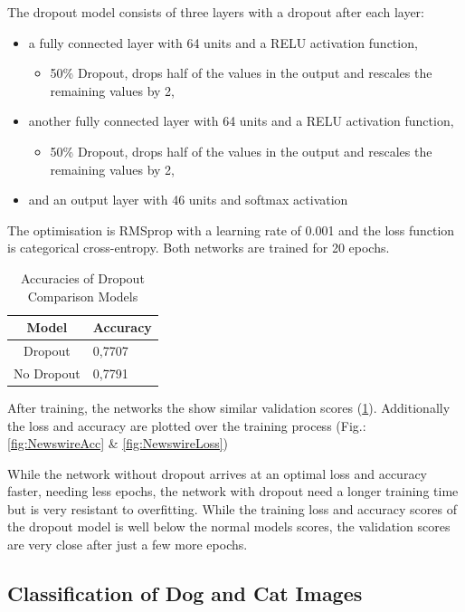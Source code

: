\documentclass[sigconf]{acmart}
\begin{document}
The dropout model consists of three layers with a dropout after each layer:
\begin{itemize}
\item a fully connected layer with 64 units and a RELU activation function,
\begin{itemize}
	\item 50\% Dropout, drops half of the values in the output and rescales the remaining values by 2,
\end{itemize}
\item another fully connected layer with 64 units and a RELU activation function,
\begin{itemize}
	\item 50\% Dropout, drops half of the values in the output and rescales the remaining values by 2,
\end{itemize}
\item and an output layer with 46 units and softmax activation
\end{itemize}
The optimisation is RMSprop with a learning rate of 0.001 and the loss function is categorical cross-entropy.
Both networks are trained for 20 epochs.

\begin{table}[h]
  \caption{Accuracies of Dropout Comparison Models}
  \label{tab:dropoutAccuracy}
  \begin{tabular}{ c | l }
    \toprule
    Model & Accuracy \\
    \midrule
    Dropout & 0,7707 \\
	No Dropout & 0,7791 \\
  	\bottomrule
  \end{tabular}
\end{table}

After training, the networks the show similar validation scores (\ref{tab:dropoutAccuracy}).
Additionally the loss and accuracy are plotted over the training process (Fig.: \ref{fig:NewswireAcc} \& \ref{fig:NewswireLoss})

While the network without dropout arrives at an optimal loss and accuracy faster, needing less epochs, the network with dropout need a longer training time but is very resistant to overfitting.
While the training loss and accuracy scores of the dropout model is well below the normal models scores, the validation scores are very close after just a few more epochs.

\subsection{Classification of Dog and Cat Images}
\end{document}
